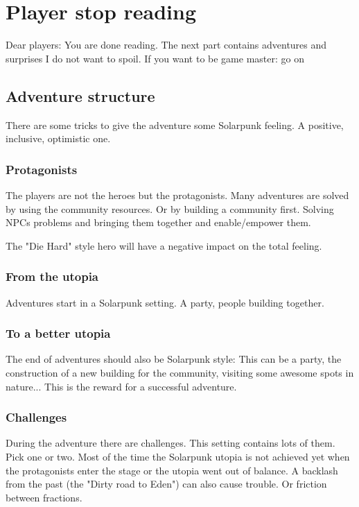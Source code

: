 \chapter{Player stop reading}

Dear players: You are done reading. The next part contains adventures and surprises I do not want to spoil. If you want to be game master: go on


\section{Adventure structure}

There are some tricks to give the adventure some Solarpunk feeling. A positive, inclusive, optimistic one.

\subsection{Protagonists}

The players are not the heroes but the protagonists. Many adventures are solved by using the community resources.
Or by building a community first. Solving NPCs problems and bringing them together and enable/empower them.

The "Die Hard" style hero will have a negative impact on the total feeling.

\subsection{From the utopia}

Adventures start in a Solarpunk setting. A party, people building together.

\subsection{To a better utopia}

The end of adventures should also be Solarpunk style: This can be a party, the construction of a new building for the community, visiting some awesome spots in nature... This is the reward for a successful adventure.

\subsection{Challenges}

During the adventure there are challenges. This setting contains lots of them. Pick one or two. Most of the time the Solarpunk utopia is not achieved yet when the protagonists enter the stage or the utopia went out of balance. A backlash from the past (the "Dirty road to Eden") can also cause trouble. Or friction between fractions.

